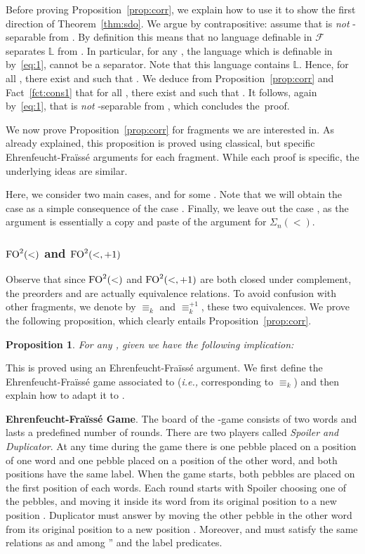 \documentclass[a4paper,USenglish]{lipics}
\newcommand{\efgame}{Ehrenfeucht-Fra\"iss\'e\xspace}
\newcommand\Lbb{\ensuremath{\mathbb{L}}\xspace}
\newcommand\Fs{\ensuremath{\mathcal{F}}\xspace}
\newcommand{\sio}[1]{\ensuremath{\Sigma_{#1}(<)}\xspace}
\newcommand{\fod}{\ensuremath{\textup{FO}^2(<)}\xspace}
\newcommand{\fodp}{\ensuremath{\textup{FO}^2(<,+1)}\xspace}
\newcommand\fodeq[1]{\ensuremath{\equiv_{#1}}\xspace}
\newcommand\kfodeq{\fodeq{k}}
\newcommand\fodeqp[1]{\ensuremath{\equiv^{+1}_{#1}}\xspace}
\newcommand\kfodeqp{\fodeqp{k}}
\newcommand\highlight[1]{\par\bigskip\noindent\textbf{\sffamily #1}.}
\theoremstyle{plain}
\newtheorem{proposition}[theorem]{Proposition}
\begin{document}
Before proving Proposition~\ref{prop:corr}, we explain how to use it to
show the first direction of Theorem~\ref{thm:sdo}.
We argue by contrapositive: assume that  is \emph{not} -separable from . By
definition this means that no language definable in \Fs separates \Lbb
from . In particular, for any , the
language  which is definable in  by~\eqref{eq:1}, cannot be a separator. Note that this language
contains \Lbb. Hence, for all , there exist  and
 such that . We deduce from
Proposition~\ref{prop:corr} and Fact~\ref{fct:cons1} that for all , there exist  and  such that . It
follows, again by~\eqref{eq:1}, that  is \emph{not} -separable
from , which concludes the~proof.

We now prove Proposition~\ref{prop:corr} for fragments we are interested
in. As already explained, this proposition is proved using classical, but
specific \efgame arguments for each fragment. While each proof is specific,
the underlying ideas are similar.

Here, we consider two main cases,  and  for some
. Note that we will obtain the case  as a simple consequence
of the case . Finally, we leave out the case , as the
argument is essentially a copy and paste of the argument for \sio{n}.

\subsubsection{\texorpdfstring{\fod and \fodp}{FO2(<) and FO2(<,+1)}}
\label{sec:fod-fodp-1}
Observe that since \fod and \fodp are both closed under complement,
the preorders  and  are actually equivalence
relations. To avoid confusion with other fragments, we denote by
\kfodeq and \kfodeqp, these two equivalences. We prove
the following proposition, which clearly entails Proposition~\ref{prop:corr}.

\begin{proposition} \label{prop:fodcor}
  For any , given  we have the
  following implication:
  
\end{proposition}

This is proved using an \efgame argument. We first define the \efgame
game associated to  (\emph{i.e.,} corresponding to \kfodeq) and
then explain how to adapt it to .


\highlight{\efgame Game} The board of the -game consists of two words
and lasts a predefined number  of rounds. There are two players
called \emph{Spoiler and Duplicator}. At any time during the game there
is one pebble placed on a position of one word and one pebble placed
on a position of the other word, and both positions have the same
label. When the game starts, both pebbles are placed on the first
position of each words. Each round starts with Spoiler choosing one
of the pebbles, and moving it inside its word from its original
position  to a new position . Duplicator must answer by moving
the other pebble in the other word from its original position  to
a new position . Moreover,  and  must satisfy the same
relations as  and  among '' and the label predicates.
\end{document}
